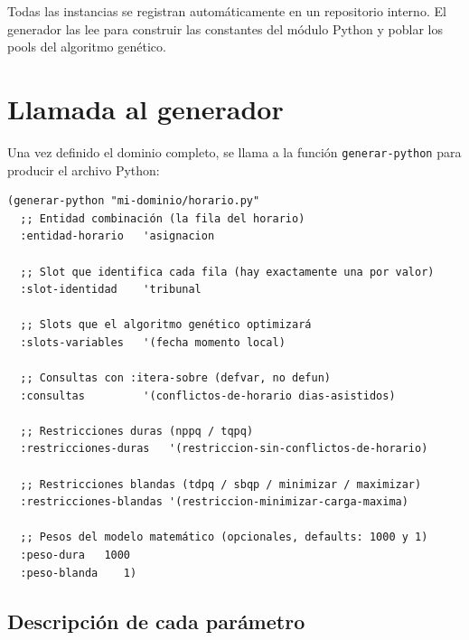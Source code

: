 \documentclass[12pt,a4paper]{article}
\newcommand{\code}[1]{\texttt{#1}}
\begin{document}
Todas las instancias se registran automáticamente en un repositorio
interno. El generador las lee para construir las constantes del módulo
Python y poblar los pools del algoritmo genético.

\section{Llamada al generador}
\label{sec:llamada}

Una vez definido el dominio completo, se llama a la función
\code{generar-python} para producir el archivo Python:

\begin{lstlisting}[style=lisp, caption={Llamada completa a generar-python}]
(generar-python "mi-dominio/horario.py"
  ;; Entidad combinación (la fila del horario)
  :entidad-horario   'asignacion

  ;; Slot que identifica cada fila (hay exactamente una por valor)
  :slot-identidad    'tribunal

  ;; Slots que el algoritmo genético optimizará
  :slots-variables   '(fecha momento local)

  ;; Consultas con :itera-sobre (defvar, no defun)
  :consultas         '(conflictos-de-horario dias-asistidos)

  ;; Restricciones duras (nppq / tqpq)
  :restricciones-duras   '(restriccion-sin-conflictos-de-horario)

  ;; Restricciones blandas (tdpq / sbqp / minimizar / maximizar)
  :restricciones-blandas '(restriccion-minimizar-carga-maxima)

  ;; Pesos del modelo matemático (opcionales, defaults: 1000 y 1)
  :peso-dura   1000
  :peso-blanda    1)
\end{lstlisting}

\subsection{Descripción de cada parámetro}
\end{document}
